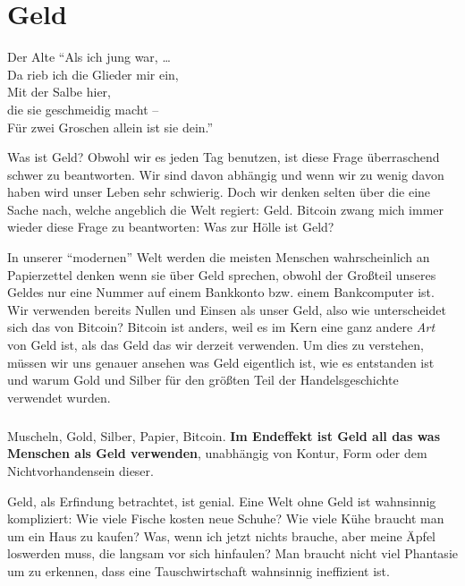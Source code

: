 \chapter{Geld}
\label{les:11}

\begin{chapquote}{Der Alte}
\enquote{Als ich jung war, \ldots \\
Da rieb ich die Glieder mir ein, \\
Mit der Salbe hier, \\
die sie geschmeidig macht -- \\
Für zwei Groschen allein ist sie dein.}
\end{chapquote}

Was ist Geld? Obwohl wir es jeden Tag benutzen, ist diese Frage überraschend
schwer zu beantworten. Wir sind davon abhängig und wenn wir zu wenig davon haben
wird unser Leben sehr schwierig. Doch wir denken selten über die eine Sache
nach, welche angeblich die Welt regiert: Geld. Bitcoin zwang mich immer wieder
diese Frage zu beantworten: Was zur Hölle ist Geld?

In unserer \enquote{modernen} Welt werden die meisten Menschen wahrscheinlich an
Papierzettel denken wenn sie über Geld sprechen, obwohl der Großteil unseres
Geldes nur eine Nummer auf einem Bankkonto bzw. einem Bankcomputer ist. Wir
verwenden bereits Nullen und Einsen als unser Geld, also wie unterscheidet sich
das von Bitcoin? Bitcoin ist anders, weil es im Kern eine ganz andere
\textit{Art} von Geld ist, als das Geld das wir derzeit verwenden. Um dies zu
verstehen, müssen wir uns genauer ansehen was Geld eigentlich ist, wie es
entstanden ist und warum Gold und Silber für den größten Teil der
Handelsgeschichte verwendet wurden.

\paragraph{}
Muscheln, Gold, Silber, Papier, Bitcoin. \textbf{Im Endeffekt ist Geld all das
was Menschen als Geld verwenden}, unabhängig von Kontur, Form
oder dem Nichtvorhandensein dieser.

Geld, als Erfindung betrachtet, ist genial. Eine Welt ohne Geld ist wahnsinnig
kompliziert: Wie viele Fische kosten neue Schuhe? Wie viele Kühe braucht man um
ein Haus zu kaufen? Was, wenn ich jetzt nichts brauche, aber meine Äpfel
loswerden muss, die langsam vor sich hinfaulen? Man braucht nicht viel Phantasie
um zu erkennen, dass eine Tauschwirtschaft wahnsinnig ineffizient ist.

